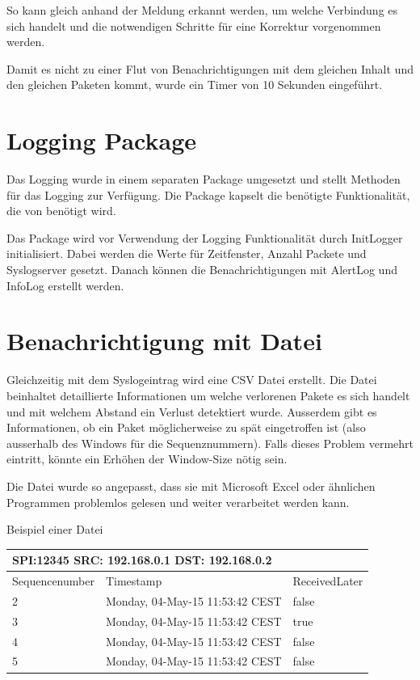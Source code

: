 
\noindent So kann gleich anhand der Meldung erkannt werden, um welche Verbindung es sich handelt und die notwendigen Schritte für eine Korrektur vorgenommen werden.

\noindent Damit es nicht zu einer Flut von Benachrichtigungen mit dem gleichen Inhalt und den gleichen Paketen kommt, wurde ein Timer von 10 Sekunden eingeführt.

\section{ Logging Package}

\noindent Das Logging wurde in einem separaten Package umgesetzt und stellt Methoden für das Logging zur Verfügung. Die Package kapselt die benötigte Funktionalität, die von  benötigt wird.

\noindent Das Package wird vor Verwendung der Logging Funktionalität durch InitLogger initialisiert. Dabei werden die Werte für Zeitfenster, Anzahl Packete und Syslogserver gesetzt. Danach können die Benachrichtigungen mit AlertLog und InfoLog erstellt werden.

\section{ Benachrichtigung mit Datei}

\noindent Gleichzeitig mit dem Syslogeintrag wird eine CSV Datei erstellt. Die Datei beinhaltet detaillierte Informationen um welche verlorenen Pakete es sich handelt und mit welchem Abstand ein Verlust detektiert wurde. Ausserdem gibt es Informationen, ob ein Paket möglicherweise zu spät eingetroffen ist (also ausserhalb des Windows für die Sequenznummern). Falls dieses Problem vermehrt eintritt, könnte ein Erhöhen der Window-Size nötig sein.

\noindent Die Datei wurde so angepasst, dass sie mit Microsoft Excel oder ähnlichen Programmen problemlos gelesen und weiter verarbeitet werden kann.

\noindent Beispiel einer Datei

\begin{tabular}{|p{0.9in}|p{1.7in}|p{0.8in}|} \hline 
\multicolumn{2}{|p{1in}|}{SPI:12345 SRC: 192.168.0.1 DST: 192.168.0.2} &  \\ \hline 
Sequencenumber & Timestamp & ReceivedLater \\ \hline 
2 & Monday, 04-May-15 11:53:42 CEST & false \\ \hline 
3 & Monday, 04-May-15 11:53:42 CEST & true \\ \hline 
4 & Monday, 04-May-15 11:53:42 CEST & false \\ \hline 
5 & Monday, 04-May-15 11:53:42 CEST & false \\ \hline 
\end{tabular}

